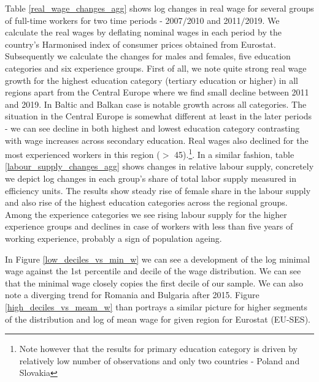 \documentclass{article}
\begin{document}
Table \ref{real_wage_changes_agg} shows log changes in real wage for several groups of full-time workers for two time periods - 2007$/$2010 and 2011$/$2019. We calculate the real wages by deflating nominal wages in each period by the country's Harmonised index of consumer prices obtained from Eurostat. Subsequently we calculate the changes for males and females, five education categories and six experience groups. First of all, we note quite strong real wage growth for the highest education category (tertiary education or higher) in all regions apart from the Central Europe where we find small decline between 2011 and 2019. In Baltic and Balkan case is notable growth across all categories. The situation in the Central Europe is somewhat different at least in the later periods - we can see decline in both highest and lowest education category contrasting with wage increases across secondary education. Real wages also declined for the most experienced workers in this region ($>$ 45).\footnote{Note however that the results for primary education category is driven by relatively low number of observations and only two countries - Poland and Slovakia}.
In a similar fashion, table \ref{labour_supply_changes_agg} shows changes in relative labour supply, concretely we depict log changes in each group's share of total labor supply measured in efficiency units. The results show steady rise of female share in the labour supply and also rise of the highest education categories across the regional groups. Among the experience categories we see rising labour supply for the higher experience groups and declines in case of workers with less than five years of working experience, probably a sign of population ageing.

In Figure \ref{low_deciles_vs_min_w} we can see a development of the log minimal wage against the 1st percentile and decile of the wage distribution. We can see that the minimal wage closely copies the first decile of our sample. We can also note a diverging trend for Romania and Bulgaria after 2015. Figure \ref{high_deciles_vs_meam_w} than portrays a similar picture for higher segments of the distribution and log of mean wage for given region for Eurostat (EU-SES).
\end{document}
